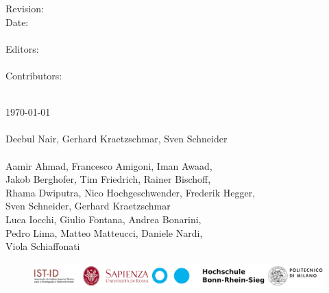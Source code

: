 \vfill
\noindent
\begin{minipage}[t]{0.18\textwidth}
\flushleft
	Revision:\\
	Date:\\
	\mbox{~}\\
	Editors:\\
	\mbox{~}\\
	Contributors:\\
\end{minipage}%
\hspace*{3mm}
\begin{minipage}[t]{0.8\textwidth}
\flushleft
	\revisionNumberRuleBook\\
	\today\\
	\mbox{~}\\
	Deebul Nair, Gerhard Kraetzschmar, Sven Schneider\\
	\mbox{~}\\
	Aamir Ahmad, Francesco Amigoni, Iman Awaad,\\ 
	Jakob Berghofer, Tim Friedrich, Rainer Bischoff,\\
	Rhama Dwiputra, Nico Hochgeschwender, Frederik Hegger,\\
	Sven Schneider, Gerhard Kraetzschmar \\
	Luca Iocchi, Giulio Fontana, Andrea Bonarini,\\
	Pedro Lima,	Matteo Matteucci, Daniele Nardi, \\
	Viola Schiaffonati
\end{minipage}
\hfill

\vfill
\vspace*{-10mm}
\begin{figure}[b]
	\centering
	\includegraphics[height=\institutionLogoHeight*2/5]{./fig/logos/ERL-CSR_logos.pdf}
\end{figure}

